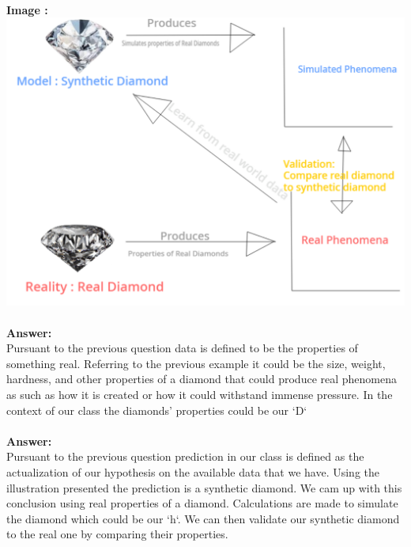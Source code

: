 \documentclass[12pt]{article}
\begin{document}
\begin{enumerate}

\\
\textbf{Image : }\\
\includegraphics[width=\linewidth]{model-drawing.png} \\

\\

\textbf{Answer: } \\
Pursuant to the previous question data is defined to be the properties of something real. Referring to the previous example it could be the size, weight, hardness, and other properties of a diamond that could produce real phenomena as such as how it is created or how it could withstand immense pressure. In the context of our class the diamonds' properties could be our `D`
\\


\\

\textbf{Answer: } \\
Pursuant to the previous question prediction in our class is defined as the actualization of our hypothesis on the available data that we have. Using the illustration presented the prediction is a synthetic diamond. We cam up with this conclusion using real properties of a diamond. Calculations are made to simulate the diamond which could be our `h`. We can then validate our synthetic diamond to the real one by comparing their properties. 
\\


\end{enumerate}
\end{document}

